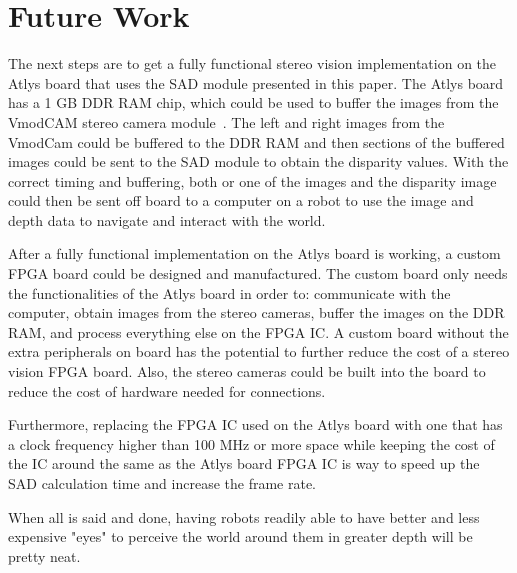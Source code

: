 \chapter{Future Work}

The next steps are to get a fully functional stereo vision implementation on the Atlys board that uses the SAD module presented in this paper. The Atlys board has a 1 GB DDR RAM chip, which could be used to buffer the images from the VmodCAM stereo camera module~\cite{atlysBoard}. The left and right images from the VmodCam could be buffered to the DDR RAM and then sections of the buffered images could be sent to the SAD module to obtain the disparity values. With the correct timing and buffering, both or one of the images and the disparity image could then be sent off board to a computer on a robot to use the image and depth data to navigate and interact with the world.

After a fully functional implementation on the Atlys board is working, a custom FPGA board could be designed and manufactured. The custom board only needs the functionalities of the Atlys board in order to: communicate with the computer, obtain images from the stereo cameras, buffer the images on the DDR RAM, and process everything else on the FPGA IC. A custom board without the extra peripherals on board has the potential to further reduce the cost of a stereo vision FPGA board. Also, the stereo cameras could be built into the board to reduce the cost of hardware needed for connections.

Furthermore, replacing the FPGA IC used on the Atlys board with one that has a clock frequency higher than 100 MHz or more space while keeping the cost of the IC around the same as the Atlys board FPGA IC is way to speed up the SAD calculation time and increase the frame rate.

When all is said and done, having robots readily able to have better and less expensive "eyes" to perceive the world around them in greater depth will be pretty neat.